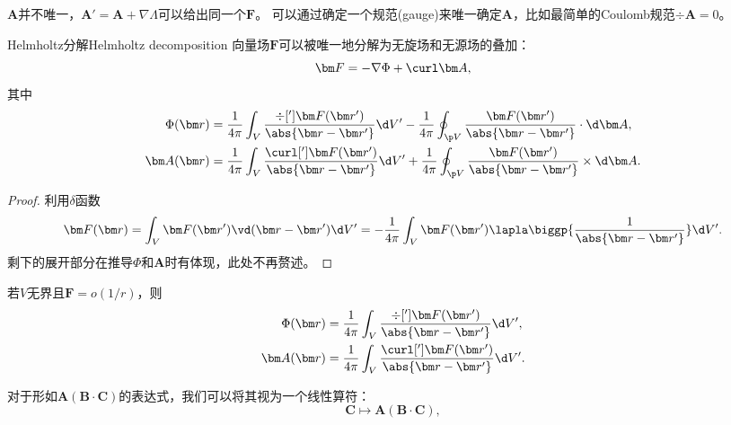 \begin{remark}
    $\bm A$并不唯一，$\bm A'=\bm A+\nabla\varLambda$可以给出同一个$\bm F$。
    可以通过确定一个规范(gauge)来唯一确定$\bm A$，比如最简单的Coulomb规范$\div\bm A=0$。
\end{remark}

\begin{theorem}{Helmholtz分解}{Helmholtz decomposition}
    向量场$\bm F$可以被唯一地分解为无旋场和无源场的叠加：
    \begin{equation}
        \bm F=-\nabla\Phi+\curl\bm A,
    \end{equation}
    其中
    \begin{subequations}
        \begin{align}
            \Phi(\bm r)&=\frac1{4\pi}\int_V\frac{\div[']\bm F(\bm r')}{\abs{\bm r-\bm r'}}\d V'-\frac1{4\pi}\oint_{\p V}\frac{\bm F(\bm r')}{\abs{\bm r-\bm r'}}\cdot\d\bm A,\\
            \bm A(\bm r)&=\frac1{4\pi}\int_V\frac{\curl[']\bm F(\bm r')}{\abs{\bm r-\bm r'}}\d V'+\frac1{4\pi}\oint_{\p V}\frac{\bm F(\bm r')}{\abs{\bm r-\bm r'}}\times\d\bm A.
        \end{align}
    \end{subequations}
\end{theorem}

\begin{proof}
    利用$\delta$函数
    \[
        \bm F(\bm r)=\int_V\bm F(\bm r')\vd(\bm r-\bm r')\d V'=-\frac1{4\pi}\int_V\bm F(\bm r')\lapla\biggp{\frac1{\abs{\bm r-\bm r'}}}\d V'.
    \]
    剩下的展开部分在推导$\Phi$和$\bm A$时有体现，此处不再赘述。    
\end{proof}

\begin{corollary}
    若$V$无界且$\bm F=o(1/r)$，则
    \begin{subequations}
        \begin{align}
            \Phi(\bm r)&=\frac1{4\pi}\int_V\frac{\div[']\bm F(\bm r')}{\abs{\bm r-\bm r'}}\d V',\\
            \bm A(\bm r)&=\frac1{4\pi}\int_V\frac{\curl[']\bm F(\bm r')}{\abs{\bm r-\bm r'}}\d V'.
        \end{align}
    \end{subequations}
\end{corollary}


对于形如$\bm A(\bm B\cdot\bm C)$的表达式，我们可以将其视为一个线性算符：
\[
    \bm C\mapsto\bm A(\bm B\cdot\bm C),
\]

